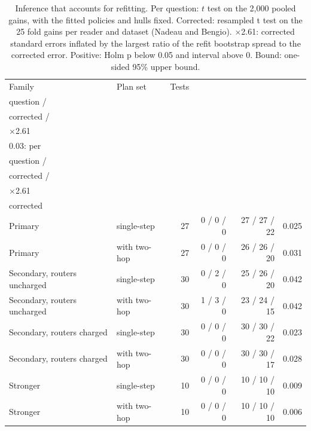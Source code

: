 \begin{table}[t]
\centering\small
\setlength{\tabcolsep}{4pt}
\caption{Inference that accounts for refitting. Per question: $t$ test on the 2,000 pooled gains, with the fitted policies and hulls fixed. Corrected: resampled t test on the 25 fold gains per reader and dataset (Nadeau and Bengio). $\times$2.61: corrected standard errors inflated by the largest ratio of the refit bootstrap spread to the corrected error. Positive: Holm p below 0.05 and interval above 0. Bound: one-sided 95\% upper bound.}
\label{tab:rev2_inference}
\begin{tabular*}{\linewidth}{@{\extracolsep{\fill}}llrrrr}
\toprule
Family & Plan set & Tests & \begin{tabular}[b]{@{}r@{}}Positive: per \\ question / \\ corrected / \\ $\times$2.61\end{tabular} & \begin{tabular}[b]{@{}r@{}}Bound below \\ 0.03: per \\ question / \\ corrected / \\ $\times$2.61\end{tabular} & \begin{tabular}[b]{@{}r@{}}Largest bound, \\ corrected\end{tabular} \\
\midrule
Primary & single-step & 27 & 0 / 0 / 0 & 27 / 27 / 22 & 0.025 \\
Primary & with two-hop & 27 & 0 / 0 / 0 & 26 / 26 / 20 & 0.031 \\
Secondary, routers uncharged & single-step & 30 & 0 / 2 / 0 & 25 / 26 / 20 & 0.042 \\
Secondary, routers uncharged & with two-hop & 30 & 1 / 3 / 0 & 23 / 24 / 15 & 0.042 \\
Secondary, routers charged & single-step & 30 & 0 / 0 / 0 & 30 / 30 / 22 & 0.023 \\
Secondary, routers charged & with two-hop & 30 & 0 / 0 / 0 & 30 / 30 / 17 & 0.028 \\
Stronger & single-step & 10 & 0 / 0 / 0 & 10 / 10 / 10 & 0.009 \\
Stronger & with two-hop & 10 & 0 / 0 / 0 & 10 / 10 / 10 & 0.006 \\
\bottomrule
\end{tabular*}
\end{table}
